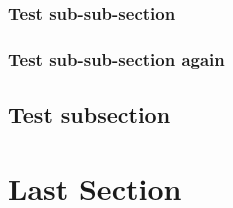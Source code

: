\documentclass[a4paper,openany]{book}
\begin{document}
{\begin{multicols}{2}
\subsubsection{Test sub-sub-section}

\lipsum[10]

\subsubsection{Test sub-sub-section again}

\subsection{Test subsection}

\lipsum[2]

\elf


\lipsum[10]

\section{Last Section}

\lipsum[3]

\end{multicols}

}

\tableofcontents



\end{document}
